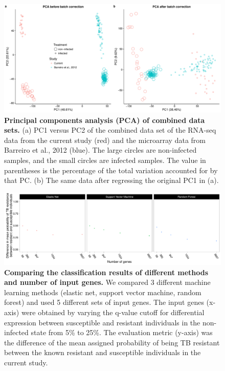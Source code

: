 \begin{figure}[ht]
\centering
\includegraphics[width=5in]{img/ch03/combined-pca.pdf}
\caption[Principal components analysis (PCA) of combined data sets.]{
\textbf{Principal components analysis (PCA) of combined data sets.} (a) PC1
versus PC2 of the combined data set of the RNA-seq data from the
current study (red) and the microarray data from Barreiro et al., 2012
\citep{Barreiro2012} (blue). The large circles are non-infected
samples, and the small circles are infected samples. The value in
parentheses is the percentage of the total variation accounted for by
that PC. (b) The same data after regressing the original PC1 in (a).
}
\label{fig:combined-pca}
\end{figure}

\begin{figure}[ht]
\centering
\includegraphics[width=5in]{img/ch03/classifier-compare.pdf}
\caption[Comparing the classification results of different methods and number
of input genes.]{
\textbf{Comparing the classification results of different methods and number
of input genes.} We compared 3 different machine learning methods
(elastic net, support vector machine, random forest) and used 5
different sets of input genes. The input genes (x-axis) were obtained
by varying the q-value cutoff for differential expression between
susceptible and resistant individuals in the non-infected state from
5\% to 25\%. The evaluation metric (y-axis) was the difference of the
mean assigned probability of being TB resistant between the known
resistant and susceptible individuals in the current study.
}
\label{fig:class-compare}
\end{figure}

